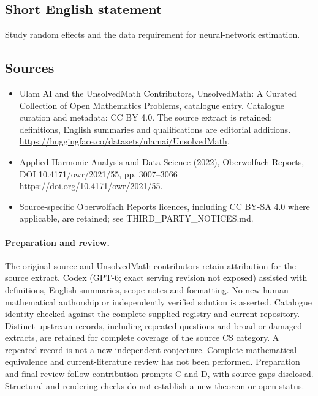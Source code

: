 \documentclass[11pt]{article}
\begin{document}
\subsection{Short English statement}
Study random effects and the data requirement for neural-network estimation.
\subsection{Sources}
\begin{itemize}
\item[\hypertarget{source:statement:1}{S1}] Ulam AI and the UnsolvedMath Contributors, UnsolvedMath: A Curated Collection of Open Mathematics Problems, catalogue entry. Catalogue curation and metadata: CC BY 4.0. The source extract is retained; definitions, English summaries and qualifications are editorial additions.
\url{https://huggingface.co/datasets/ulamai/UnsolvedMath}.
\item[\hypertarget{source:statement:2}{S2}] Applied Harmonic Analysis and Data Science (2022), Oberwolfach Reports, DOI 10.4171/owr/2021/55, pp. 3007--3066
\url{https://doi.org/10.4171/owr/2021/55}.
\item Source-specific Oberwolfach Reports licences, including CC BY-SA 4.0 where applicable, are retained; see THIRD\_PARTY\_NOTICES.md.
\end{itemize}
\paragraph{Preparation and review.}
The original source and UnsolvedMath contributors retain attribution for the source extract. Codex (GPT-6; exact serving revision not exposed) assisted with definitions, English summaries, scope notes and formatting. No new human mathematical authorship or independently verified solution is asserted. Catalogue identity checked against the complete supplied registry and current repository. Distinct upstream records, including repeated questions and broad or damaged extracts, are retained for complete coverage of the source CS category. A repeated record is not a new independent conjecture. Complete mathematical-equivalence and current-literature review has not been performed. Preparation and final review follow contribution prompts C and D, with source gaps disclosed. Structural and rendering checks do not establish a new theorem or open status.
\label{end:statement}
\end{document}
